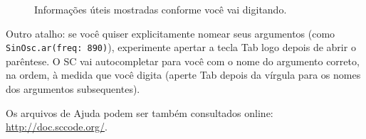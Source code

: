 \begin{figure}[h]
\centerline{}
\caption{Informações úteis mostradas conforme você vai digitando.}
\label{fig:tooltip}
\end{figure}

Outro atalho: se você quiser explicitamente nomear seus argumentos (como \texttt{SinOsc.ar(freq: 890)}), experimente apertar a tecla Tab logo depois de abrir o parêntese. O SC vai autocompletar para você com o nome do argumento correto, na ordem, à medida que você digita (aperte Tab depois da vírgula para os nomes dos argumentos subsequentes).

\bigskip
{}
\bigskip

Os arquivos de Ajuda podem ser também consultados online: \url{http://doc.sccode.org/}.
